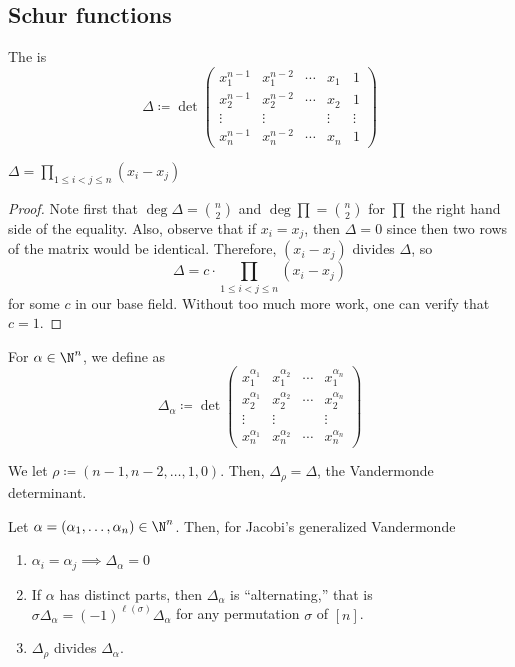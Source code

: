 \documentclass[11pt,leqno,oneside]{amsart}
\numberwithin{thm}{section}
\newcommand{\Vdet}{\Delta}
\newcommand{\rowshift}{\rho}
\newcommand{\defeq}{\coloneqq}
\begin{document}
\subsection{Schur functions}
\begin{defn}
  The  is \[
    \Vdet \defeq \det \left(
      \begin{array}{ccccc}
        x_1^{n-1}&x_1^{n-2}&\cdots&x_1&1\\
        x_2^{n-1}&x_2^{n-2}&\cdots&x_2&1\\
        \vdots& \vdots&&\vdots&\vdots\\
        x_n^{n-1}& x_n^{n-2}&\cdots&x_n&1
      \end{array}
\right)
  \]
\end{defn}
\begin{thm}
  \(\displaystyle \Vdet = \prod_{1 \leq i < j \leq n} (x_i-x_j)\)
\end{thm}
\begin{proof}
  Note first that \(\deg \Vdet = \binom{n}{2}\) and \(\deg \prod =
  \binom{n}{2}\) for \(\prod\) the right hand side of the
  equality. Also, observe that if \(x_i=x_j\), then \(\Vdet = 0\)
  since then two rows of the matrix would be identical. Therefore,
  \((x_i-x_j)\) divides \(\Vdet\), so \[
    \Vdet = c \cdot \prod_{1 \leq i < j \leq n} (x_i-x_j)
  \]
  for some \(c\) in our base field. Without too much more work, one
  can verify that \(c=1\).
\end{proof}
\begin{defn}
  For \(\alpha \in \N^n\), we define  as \[
    \Vdet_\alpha \defeq \det \left(
      \begin{array}{cccc}
        x_1^{\alpha_1}&x_1^{\alpha_2}&\cdots&x_1^{\alpha_n}\\
        x_2^{\alpha_1}&x_2^{\alpha_2}&\cdots&x_2^{\alpha_n}\\
        \vdots& \vdots&&\vdots\\
        x_n^{\alpha_1}& x_n^{\alpha_2}&\cdots&x_n^{\alpha_n}
      \end{array}
    \right)
  \]
\end{defn}
\begin{rmk}
  We let \(\rowshift \defeq (n-1,n-2,\ldots,1,0)\). Then,
  \(\Vdet_\rowshift = \Vdet\), the Vandermonde determinant.
\end{rmk}
\begin{prop}\label{vandermonde-props}
  Let \(\alpha = (\alpha_1, \ldots, \alpha_n) \in \N^n\). Then, for Jacobi's generalized Vandermonde
  \begin{enumerate}
  \item \(\alpha_i = \alpha_j \implies \Vdet_\alpha = 0\)
  \item If \(\alpha\) has distinct parts, then \(\Vdet_\alpha\) is
    ``alternating,'' that is \(\sigma \Vdet_\alpha =
    (-1)^{\ell(\sigma)} \Vdet_\alpha\) for any permutation \(\sigma\)
    of \([n]\).
  \item \(\Vdet_\rowshift\) divides \(\Vdet_\alpha\).
  \end{enumerate}
\end{prop}
\end{document}
